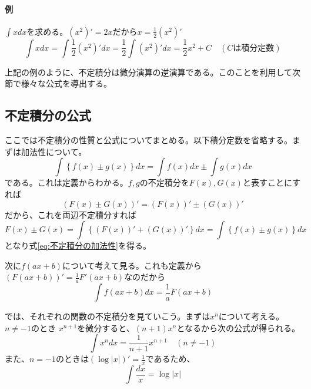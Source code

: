 \documentclass[a4j,dvipdfmx]{jsarticle}
\begin{document}
                \paragraph{例}$\displaystyle\int x dx$を求める。$(x^2)'=2x$だから$x=\frac{1}{2}(x^2)'$
                \begin{equation*}
                    \int x dx = \int \frac{1}{2}(x^2)'dx=\frac{1}{2}\int (x^2)'dx=\frac{1}{2}x^2+C\quad (\text{$C$は積分定数})
                \end{equation*}

                上記の例のように、不定積分は微分演算の逆演算である。このことを利用して次節で様々な公式を導出する。
            \clearpage
            \subsection{不定積分の公式}
                ここでは不定積分の性質と公式についてまとめる。以下積分定数を省略する。まずは加法性について。
                \begin{equation}
                    \int \left\{f(x)\pm g(x)\right\}dx=\int f(x)dx\pm \int g(x)dx \label{eq:不定積分の加法性}
                \end{equation}
                である。これは定義からわかる。$f,g$の不定積分を$F(x),G(x)$と表すことにすれば
                \begin{equation}
                    (F(x)\pm G(x))'=(F(x))'\pm(G(x))'
                \end{equation}
                だから、これを両辺不定積分すれば
                \begin{equation}
                    F(x)\pm G(x)=\int \left\{(F(x))'+(G(x))'\right\}dx=\int \left\{f(x)\pm g(x)\right\}dx
                \end{equation}
                となり式\eqref{eq:不定積分の加法性}を得る。

                次に$f(ax+b)$について考えて見る。これも定義から$(F(ax+b))'=\frac{1}{a}F'(ax+b)$なのだから
                \begin{equation}
                    \int f(ax+b)dx=\frac{1}{a}F(ax+b)\label{eq:f(ax+b)の不定積分}
                \end{equation}

                では、それぞれの関数の不定積分を見ていこう。まずは$x^n$について考える。$n\neq -1$のとき
                $x^{n+1}$を微分すると、$(n+1)x^{n}$となるから次の公式が得られる。
                \begin{equation}
                    \int x^n dx = \frac{1}{n+1} x^{n+1}\quad (n\neq -1) \label{eq:x^nの不定積分}
                \end{equation}
                また、$n=-1$のときは$(\log |x|)'=\frac{1}{x}$であるため、
                \begin{equation}
                    \int \frac{dx}{x} = \log |x| \label{eq:1/xの不定積分} 
                \end{equation}
\end{document}
